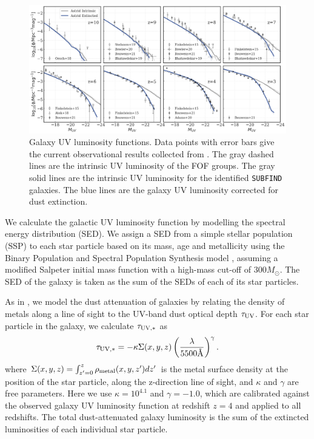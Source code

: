 \documentclass[fleqn,usenatbib]{mnras}
\def\astrid{\texttt{Astrid} }
\begin{document}
\begin{figure}
\centering
  \includegraphics[width=1.0\textwidth]{plots/UVLF-subfind-z10-z3.png}
  \caption{Galaxy UV luminosity functions. Data points with error bars give the current observational results collected from \citet{Bouwens2015,Atek2015,Atek2018,Finkelstein2015,Bhatawdekar2019,Stefanon2019,Adams2020,Bowler2020,Bouwens2021}.
  The gray dashed lines are the intrinsic UV luminosity of the FOF groups.
  The gray solid lines are the intrinsic UV luminosity for the identified \texttt{SUBFIND} galaxies. 
  The blue lines are the galaxy UV luminosity corrected for dust extinction. 
}
  \label{fig:UVLF}
\end{figure}

We calculate the galactic UV luminosity function by modelling the spectral energy distribution (SED).
We assign a SED from a simple stellar population (SSP) to each star particle based on its mass, age and metallicity using the Binary Population and Spectral Population Synthesis model \citep[BPASS, version 2.2;][]{Stanway2018}, assuming a modified Salpeter initial mass function with a high-mass cut-off of $300M_\odot$.
The SED of the galaxy is taken as the sum of the SEDs of each of its star particles. 

As in \citet{Wilkins2017}, we model the dust attenuation of galaxies by relating the density of metals along a line of sight to the UV-band dust optical depth $\tau_{\rm UV}$. For each star particle in the galaxy, we calculate $\tau_{\rm UV,\ast}$ as
\begin{equation}
\label{eq:dust_extinction}
 \tau_{{\rm UV,}\ast}= -\kappa \Sigma(x, y, z) \left(\frac{\lambda}{5500\text{\normalfont\AA}}\right)^{\gamma}.
\end{equation}
where $\Sigma(x, y, z) = \int_{z'=0}^{z} \rho_{\rm metal}(x,y,z')dz'$ is the metal surface density at the position of the star particle, along the z-direction line of sight, and $\kappa$ and $\gamma$ are free parameters. 
Here we use $\kappa=10^{4.1}$ and $\gamma=-1.0$, which are calibrated against the observed galaxy UV luminosity function at redshift $z=4$ and applied to all redshifts.
The total dust-attenuated galaxy luminosity is the sum of the extincted luminosities of each individual star particle.
\end{document}
